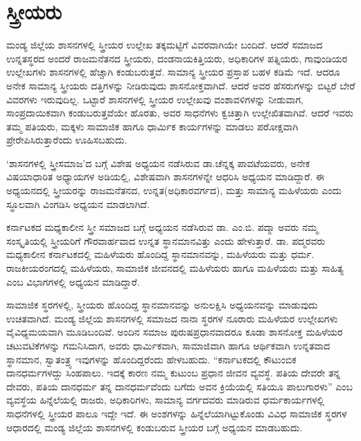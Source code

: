 \section{ಸ್ತ್ರೀಯರು}

ಮಂಡ್ಯ ಜಿಲ್ಲೆಯ ಶಾಸನಗಳಲ್ಲಿ ಸ್ತ್ರೀಯರ ಉಲ್ಲೇಖ ತಕ್ಕಮಟ್ಟಿಗೆ ವಿವರವಾಗಿಯೇ ಬಂದಿದೆ. ಆದರೆ ಸಮಾಜದ ಉನ್ನತಸ್ಥರದ ಅಂದರೆ ರಾಜಮನೆತನದ ಸ್ತ್ರೀಯರು, ದಂಡನಾಯಕಿತ್ತಿಯರು, ಅಧಿಕಾರಿಗಳ ಪತ್ನಿಯರು, ಗಾವುಂಡಿಯರ ಉಲ್ಲೇಖಗಳು ಶಾಸನಗಳಲ್ಲಿ ಹೆಚ್ಚಾಗಿ ಕಂಡುಬರುತ್ತವೆ. ಸಾಮಾನ್ಯ ಸ್ತ್ರೀಯರ ಪ್ರಸ್ತಾಪ ಬಹಳ ಕಡಿಮೆ ಇದೆ. ಆದರೂ ಅನೇಕ ಸಾಮಾನ್ಯ ಸ್ತ್ರೀಯರು ದತ್ತಿಗಳನ್ನು ನೀಡಿರುವುದು ಶಾಸನೋಕ್ತವಾಗಿದೆ. ಆದರೆ ಅವರ ಹೆಸರುಗಳನ್ನು ಬಿಟ್ಟರೆ ಬೇರೆ ವಿವರಗಳು ಇರುವುದಿಲ್ಲ. ಒಟ್ಟಾರೆ ಶಾಸನಗಳಲ್ಲಿ ಸ್ತ್ರೀಯರ ಉಲ್ಲೇಖವು ವಂಶಾವಳಿಗಳನ್ನು ನೀಡುವಾಗ, ಸಾಂಪ್ರದಾಯಿಕವಾಗಿ ಕಂಡುಬರುತ್ತವೆಯೇ ಹೊರತು, ಅವರ ಸಾಧನೆಗಳು ಕ್ವಚಿತ್ತಾಗಿ ಉಲ್ಲೇಖಿತವಾಗಿವೆ. ಆದರೆ ಇವರು ತಮ್ಮ ಪತಿಯರು, ಮಕ್ಕಳು ಸಾಮಾಜಿಕ ಹಾಗೂ ಧಾರ್ಮಿಕ ಕಾರ್ಯಗಳನ್ನು ಮಾಡಲು ಪರೋಕ್ಷವಾಗಿ ಪ್ರೇರೇಪಿಸಿರುತ್ತಾರೆಂದು ಊಹಿಸಬಹುದು.

‘ಶಾಸನಗಳಲ್ಲಿ ಸ್ತ್ರೀಸಮಾಜ’ದ ಬಗ್ಗೆ ವಿಶೇಷ ಅಧ್ಯಯನ ನಡೆಸಿರುವ ಡಾ.ಚೆನ್ನಕ್ಕ ಪಾವಟೆಯವರು, ಅನೇಕ ವಿಷಯಾಧಾರಿತ ಅಧ್ಯಾಯಗಳ ಅಡಿಯಲ್ಲಿ, ವಿಶೇಷವಾಗಿ ಶಾಸನಗಳನ್ನೇ ಆಧರಿಸಿ ಅಧ್ಯಯನ ಮಾಡಿದ್ದಾರೆ. ಈ ಅಧ್ಯಯನದಲ್ಲಿ ಸ್ತ್ರೀಯರನ್ನು ರಾಜಮನೆತನದ, ಉನ್ನತ(ಅಧಿಕಾರವರ್ಗದ), ಮತ್ತು ಸಾಮಾನ್ಯ ಮಹಿಳೆಯರು ಎಂದು ಸ್ಥೂಲವಾಗಿ ವಿಂಗಡಿಸಿ ಅಧ್ಯಯನ ಮಾಡಲಾಗಿದೆ.

ಕರ್ನಾಟಕದ ಮಧ್ಯಕಾಲೀನ ಸ್ತ್ರೀ ಸಮಾಜದ ಬಗ್ಗೆ ಅಧ್ಯಯನ ನಡೆಸಿರುವ ಡಾ. ಎಂ.ಬಿ. ಪದ್ಮಾ ಅವರು ನಮ್ಮ ಸಂಸ್ಕೃತಿಯಲ್ಲಿ ಸ್ತ್ರೀಯರಿಗೆ ಗೌರವಾರ್ಹವಾದ ಉನ್ನತ ಸ್ಥಾನಮಾನವಿತ್ತು ಎಂದು ಹೇಳುತ್ತಾರೆ. ಡಾ. ಪದ್ಮರವರು ಮಧ್ಯಕಾಲೀನ ಕರ್ನಾಟಕದಲ್ಲಿ ಮಹಿಳೆಯರು ಹೊಂದಿದ್ದ ಸ್ಥಾನಮಾನವನ್ನು, ಮಹಿಳೆಯರು ಮತ್ತು ಧರ್ಮ. ರಾಜಕೀಯ\-ರಂಗದಲ್ಲಿ ಮಹಿಳೆಯರು, ಸಾಮಾಜಿಕ ಜೀವನದಲ್ಲಿ ಮಹಿಳೆಯರು ಹಾಗೂ ಮಹಿಳೆಯರು ಮತ್ತು ಸಾಹಿತ್ಯ ಎಂಬ ವಿಭಾಗಗಳಲ್ಲಿ ಅಧ್ಯಯನ ಮಾಡಿದ್ದಾರೆ.

ಸಾಮಾಜಿಕ ಸ್ಥರಗಳಲ್ಲಿ, ಸ್ತ್ರೀಯರು ಹೊಂದಿದ್ದ ಸ್ಥಾನಮಾನವನ್ನು ಅನುಲಕ್ಷಿಸಿ ಅಧ್ಯಯನವನ್ನು ಮಾಡುವುದು ಉಚಿತವಾಗಿದೆ. ಮಂಡ್ಯ ಜಿಲ್ಲೆಯ ಶಾಸನಗಳಲ್ಲಿ ಸಮಾಜದ ನಾನಾ ಸ್ಥರಗಳ ನೂರಾರು ಮಹಿಳೆಯರ ಉಲ್ಲೇಖಗಳು ವೈವಿಧ್ಯಮಯವಾಗಿ ಮೂಡಿಬಂದಿವೆ. ಅಂದಿನ ಸಮಾಜ ಪುರುಷಪ್ರಧಾನವಾದರೂ ಕೂಡಾ ಶಾಸನೋಕ್ತ ಮಹಿಳೆಯರ ಚಟುವಟಿಕೆಗಳನ್ನು ಗಮನಿಸಿದಾಗ, ಅವರು ಧಾರ್ಮಿಕವಾಗಿ, ಸಾಮಾಜಿವಾಗಿ ಹಾಗೂ ಆರ್ಥಿಕವಾಗಿ ಉನ್ನತವಾದ ಸ್ಥಾನಮಾನ, ಸ್ವಾತಂತ್ರ್ಯ ಇವುಗಳನ್ನು ಹೊಂದಿದ್ದರೆಂದು ಹೇಳಬಹುದು. “ಕರ್ನಾಟಕದಲ್ಲಿ ಕೌಟುಂಬಿಕ ದಾನಧರ್ಮಗಳದ್ದು ಸಿಂಹಪಾಲು. ಇದಕ್ಕೆ ಕಾರಣ ನಮ್ಮ ಕುಟುಂಬ ಪ್ರಧಾನ ಜೀವನ ವ್ಯವಸ್ಥೆ. ಪತಿಯ ದೇವರೇ ತನ್ನ ದೇವರು, ಪತಿಯ ದಾನಧರ್ಮ ತನ್ನ ದಾನಧರ್ಮವೆಂದು ಬಗೆದು ಅವನ ಕ್ರಿಯೆಯಲ್ಲಿ ಸತಿಯೂ ಪಾಲುಗಾರಳು” ಎಂಬ ವ್ಯವಸ್ಥೆಯ ಹಿನ್ನೆಲೆಯಲ್ಲಿ ರಾಜರು, ಅಧಿಕಾರಿಗಳು, ಸಾಮಾನ್ಯ ವರ್ಗದವರು ಮಾಡಿರುವ ಧರ್ಮಕಾರ್ಯಗಳಲ್ಲಿ ಸಾಧನೆಗಳಲ್ಲಿ ಸ್ತ್ರೀಯರ ಪಾಲೂ ಇದ್ದೇ ಇದೆ. ಈ ಅಂಶಗಳನ್ನು ಹಿನ್ನೆಲೆಯಾಗಿಟ್ಟುಕೊಂಡು ವಿವಿಧ ಸಾಮಾಜಿಕ ಸ್ಥರಗಳ ಆಧಾರದಲ್ಲಿ ಮಂಡ್ಯ ಜಿಲ್ಲೆಯ ಶಾಸನಗಳಲ್ಲಿ ಕಂಡುಬರುವ ಸ್ತ್ರೀಯರ ಬಗ್ಗೆ ಅಧ್ಯಯನ ಮಾಡಬಹುದು.


